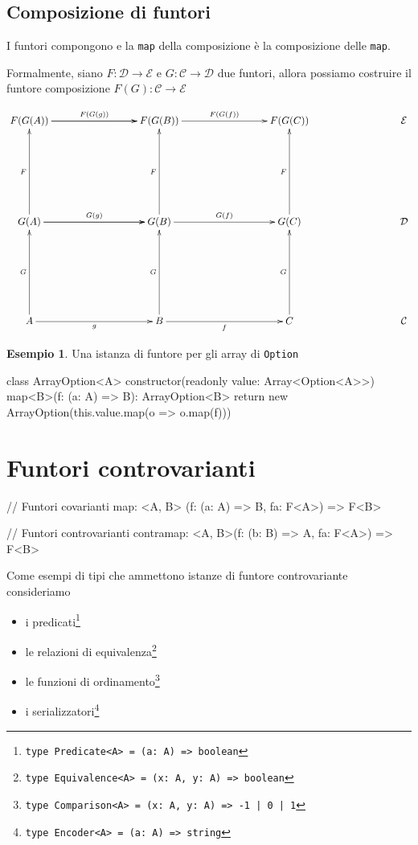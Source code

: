 \documentclass[12pt]{article}
\theoremstyle{definition}
\newtheorem{example}{Esempio}[section]
\newenvironment{code}
  {\vspace{0.5cm} \VerbatimEnvironment\begin{typescriptcode}}
  {\end{typescriptcode} \vspace{0.2cm}}
\begin{document}
\subsection{Composizione di funtori}

I funtori compongono e la \texttt{map} della composizione è la composizione delle \texttt{map}.

Formalmente, siano $F: \mathcal{D} \rightarrow \mathcal{E}$ e $G: \mathcal{C} \rightarrow \mathcal{D}$ due funtori,
allora possiamo costruire il funtore composizione $F(G): \mathcal{C} \rightarrow \mathcal{E}$

\[
\xymatrixrowsep{3cm}
\xymatrixcolsep{3cm}
\xymatrix{
  F(G(A)) \ar[r]^{F(G(g))} \ar[r] & F(G(B)) \ar[r]^{F(G(f))} & F(G(C)) & \mathcal{E} \\
  G(A) \ar[u]^F \ar[r]^{G(g)} \ar[r] & G(B) \ar[u]^F \ar[r]^{G(f)} & G(C) \ar[u]^F & \mathcal{D} \\
  A \ar[u]^G \ar[r]_g & B \ar[u]^G \ar[r]_f & C \ar[u]^G & \mathcal{C}
}
\]

\begin{example}
Una istanza di funtore per gli array di \texttt{Option}

\begin{code}
class ArrayOption<A> {
  constructor(readonly value: Array<Option<A>>) {}
  map<B>(f: (a: A) => B): ArrayOption<B> {
    return new ArrayOption(this.value.map(o => o.map(f)))
  }
}
\end{code}
\end{example}

\newpage

\section{Funtori controvarianti}

\begin{code}
// Funtori covarianti
map: <A, B>      (f: (a: A) => B, fa: F<A>) => F<B>

// Funtori controvarianti
contramap: <A, B>(f: (b: B) => A, fa: F<A>) => F<B>
\end{code}

Come esempi di tipi che ammettono istanze di funtore controvariante consideriamo

\begin{itemize}
  \item i predicati\footnote{\texttt{type Predicate<A> = (a: A) => boolean}}
  \item le relazioni di equivalenza\footnote{\texttt{type Equivalence<A> = (x: A, y: A) => boolean}}
  \item le funzioni di ordinamento\footnote{\texttt{type Comparison<A> = (x: A, y: A) => -1 | 0 | 1}}
  \item i serializzatori\footnote{\texttt{type Encoder<A> = (a: A) => string}}
\end{itemize}
\end{document}
